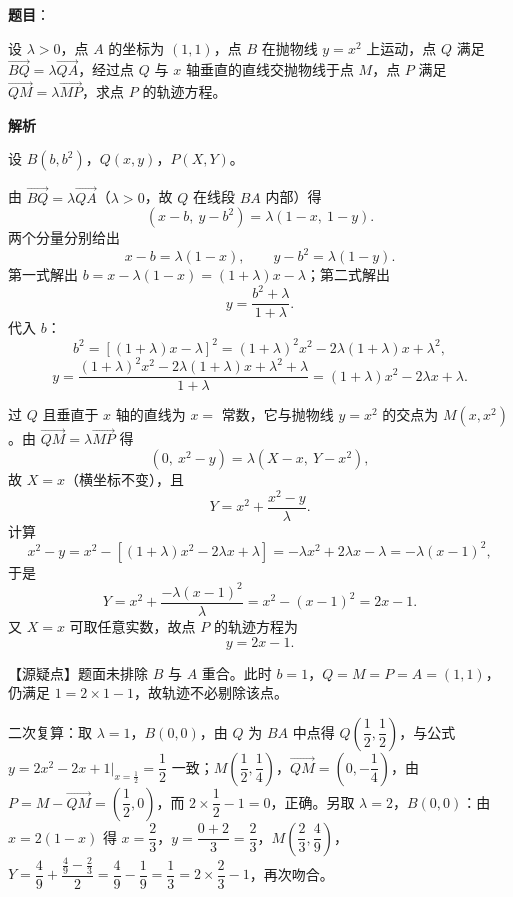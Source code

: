 \begin{answer}

\textbf{题目}：

设 $\lambda>0$，点 $A$ 的坐标为 $(1,1)$，点 $B$ 在抛物线 $y=x^2$ 上运动，点 $Q$ 满足 $\overrightarrow{BQ}=\lambda\overrightarrow{QA}$，经过点 $Q$ 与 $x$ 轴垂直的直线交抛物线于点 $M$，点 $P$ 满足 $\overrightarrow{QM}=\lambda\overrightarrow{MP}$，求点 $P$ 的轨迹方程。
\nopagebreak[4]
\begin{center}\end{center}
\nopagebreak[4]
\textbf{解析}

设 $B(b,b^2)$，$Q(x,y)$，$P(X,Y)$。

由 $\overrightarrow{BQ}=\lambda\overrightarrow{QA}$（$\lambda>0$，故 $Q$ 在线段 $BA$ 内部）得
\nopagebreak[4]
\[(x-b,\ y-b^2)=\lambda(1-x,\ 1-y).\]
两个分量分别给出
\nopagebreak[4]
\[x-b=\lambda(1-x),\qquad y-b^2=\lambda(1-y).\]
第一式解出 $b=x-\lambda(1-x)=(1+\lambda)x-\lambda$；第二式解出
\nopagebreak[4]
\[y=\frac{b^2+\lambda}{1+\lambda}.\]
代入 $b$：
\nopagebreak[4]
\[b^2=\left[(1+\lambda)x-\lambda\right]^2=(1+\lambda)^2x^2-2\lambda(1+\lambda)x+\lambda^2,\]
\nopagebreak[4]
\[y=\frac{(1+\lambda)^2x^2-2\lambda(1+\lambda)x+\lambda^2+\lambda}{1+\lambda}=(1+\lambda)x^2-2\lambda x+\lambda.\]

过 $Q$ 且垂直于 $x$ 轴的直线为 $x=$ 常数，它与抛物线 $y=x^2$ 的交点为 $M(x,x^2)$。由 $\overrightarrow{QM}=\lambda\overrightarrow{MP}$ 得
\nopagebreak[4]
\[(0,\ x^2-y)=\lambda(X-x,\ Y-x^2),\]
故 $X=x$（横坐标不变），且
\nopagebreak[4]
\[Y=x^2+\frac{x^2-y}{\lambda}.\]
计算
\nopagebreak[4]
\[x^2-y=x^2-\left[(1+\lambda)x^2-2\lambda x+\lambda\right]=-\lambda x^2+2\lambda x-\lambda=-\lambda(x-1)^2,\]
于是
\nopagebreak[4]
\[Y=x^2+\frac{-\lambda(x-1)^2}{\lambda}=x^2-(x-1)^2=2x-1.\]
又 $X=x$ 可取任意实数，故点 $P$ 的轨迹方程为
\nopagebreak[4]
\[y=2x-1.\]

【源疑点】题面未排除 $B$ 与 $A$ 重合。此时 $b=1$，$Q=M=P=A=(1,1)$，仍满足 $1=2\times1-1$，故轨迹不必剔除该点。

二次复算：取 $\lambda=1$，$B(0,0)$，由 $Q$ 为 $BA$ 中点得 $Q\left(\dfrac12,\dfrac12\right)$，与公式 $y=2x^2-2x+1\big|_{x=\frac12}=\dfrac12$ 一致；$M\left(\dfrac12,\dfrac14\right)$，$\overrightarrow{QM}=\left(0,-\dfrac14\right)$，由 $P=M-\overrightarrow{QM}=\left(\dfrac12,0\right)$，而 $2\times\dfrac12-1=0$，正确。另取 $\lambda=2$，$B(0,0)$：由 $x=2(1-x)$ 得 $x=\dfrac23$，$y=\dfrac{0+2}{3}=\dfrac23$，$M\left(\dfrac23,\dfrac49\right)$，$Y=\dfrac49+\dfrac{\frac49-\frac23}{2}=\dfrac49-\dfrac19=\dfrac13=2\times\dfrac23-1$，再次吻合。


\end{answer}